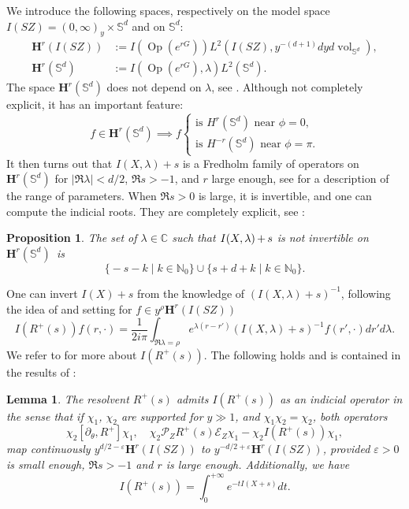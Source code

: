 \documentclass[10pt]{amsart}
\newcommand{\bH}{\boldsymbol{H}}
\newcommand{\C}{\mathbb{C}}
\newcommand{\N}{\mathbb{N}}
\newcommand{\Ss}{\mathbb{S}}
\newcommand{\eps}{\varepsilon}
\newcommand{\ZZ}{I(SZ)}
\DeclareMathOperator{\vol}{\mathrm{vol}}
\DeclareMathOperator{\Op}{Op}
\theoremstyle{plain}
\newtheorem{lemma}{Lemma}[section]
\newtheorem{proposition}{Proposition}[section]
\theoremstyle{definition}
\begin{document}
We introduce the following spaces, respectively on the model space $\ZZ=(0,\infty)_y\times\Ss^d$ and on $\Ss^d$:
\[
\begin{split}
\bH^{r}(\ZZ) &:= I(\Op(e^{rG}))L^2(\ZZ, y^{-(d+1)}dyd\vol_{\Ss^d}),\\
\bH^{r}(\Ss^d) &:= I(\Op(e^{rG}), \lambda) L^2(\Ss^d).
\end{split}
\]
The space $\bH^{r}(\Ss^d)$ does not depend on $\lambda$, see \cite[\S 3.3]{Bonthonneau-Weich-17}. Although not completely explicit, it has an important feature:
\[
f \in \bH^{r}(\Ss^d) \implies f\begin{cases}
\text{is $H^{ r}(\Ss^d)$ near $\phi=0$},\\
\text{is $H^{- r}(\Ss^d)$ near $\phi=\pi$}.
\end{cases}
\]
It then turns out that $I(X,\lambda)+s$ is a Fredholm family of operators on $\bH^{r}(\Ss^d)$ for $|\Re \lambda| < d/2$, $\Re s> -1$, and $r$ large enough, see \cite[Lem.\,3.24]{Bonthonneau-Weich-17} for a description of the range of parameters. When $\Re s>0$ is large, it is invertible, and one can compute the indicial roots. They are completely explicit, see \cite[Prop.\,5.5 \& Lem.\,5.8]{Bonthonneau-Weich-17}:

\begin{proposition}
\label{prop:computation-indicial-residue}
The set of $\lambda \!\in\! \C$ such that $I(X,\lambda) \mkern-1mu+\mkern-1mu s$ is not invertible on $\bH^{r}\!(\Ss^d)$~is
\[
\bigl\{ - s-k \mid k \in \N_{ 0}\bigr\} \cup \bigl\{s+d+k \mid k \in \N_{ 0}\bigr\}.
\]
\end{proposition}

One can invert $I(X)+s$ from the knowledge of $(I(X,\lambda)+s)^{-1}$, following the idea of \cite[Prop.\,4.5]{Bonthonneau-Lefeuvre-19-1} and setting for $f\in y^\rho\bH^r(\ZZ)$
\[
I(R^+(s))f(r,\cdot)= \frac{1}{2i\pi}\int_{\Re \lambda = \rho} e^{\lambda(r-r')}(I(X,\lambda)+s)^{-1} f(r',\cdot) dr' d\lambda.
\]
We refer to \cite[Th.\,2]{Bonthonneau-Weich-17} for more about $I(R^+(s))$. The following holds and is contained in the results of \cite[Lem.\,4.16]{Bonthonneau-Weich-17}:

\begin{lemma}
\label{lemma:admits-indicial}
The resolvent $R^+(s)$ admits $I(R^+(s))$ as an indicial operator in the sense that if $\chi_1$, $\chi_2$ are supported for $y\gg 1$, and $\chi_1\chi_2= \chi_2$, both operators
\begin{equation}\label{eq:admits-indicial}
\chi_2 [\partial_\theta, R^+] \chi_1, \quad \chi_2\mathcal{P}_Z R^+(s) \mathcal{E}_Z \chi_1 - \chi_2 I(R^+(s)) \chi_1 ,
\end{equation}
map continuously $y^{d/2-\eps} \bH^r(\ZZ)$ to $y^{-d/2+\eps}\bH^r(\ZZ)$, provided $\eps > 0$ is small enough, $\Re s>-1$ and $r$ is large enough. Additionally, we have
\begin{equation}\label{eq:I(R+)}
I(R^+(s)) = \int_0^{+\infty} e^{- t I(X+s)} dt.
\end{equation}
\end{lemma}
\end{document}
